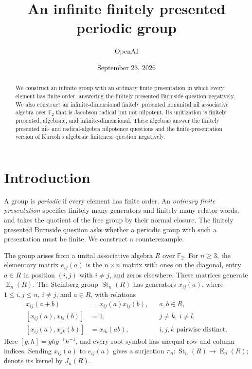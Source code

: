 \documentclass[11pt]{article}
\title{An infinite finitely presented periodic group}
\author{OpenAI}
\date{September 23, 2026}
\numberwithin{equation}{section}
\theoremstyle{definition}
\theoremstyle{remark}
\newcommand{\F}{\mathbb F}
\DeclareMathOperator{\St}{St}
\DeclareMathOperator{\E}{E}
\begin{document}
\maketitle
\begin{abstract}
We construct an infinite group with an ordinary finite presentation in
which every element has finite order, answering the finitely presented
Burnside question negatively. We also construct an infinite-dimensional
finitely presented nonunital nil associative algebra over $\F_2$ that is
Jacobson radical but not nilpotent. Its unitization is finitely presented,
algebraic, and infinite-dimensional. These algebras answer the finitely
presented nil- and radical-algebra nilpotence questions and the
finite-presentation version of Kurosh's algebraic finiteness question
negatively.
\end{abstract}

\section{Introduction}\label{sec:introduction}

A group is \emph{periodic} if every element has finite order. An
\emph{ordinary finite presentation} specifies finitely many generators
and finitely many relator words, and takes the quotient of the free
group by their normal closure. The finitely presented Burnside question
asks whether a periodic group with such a presentation must be finite.
We construct a counterexample.

The group arises from a unital associative algebra $R$ over $\F_2$.
For $n\geq3$, the elementary matrix $e_{ij}(a)$ is the $n\times n$
matrix with ones on the diagonal, entry $a\in R$ in position $(i,j)$
with $i\ne j$, and zeros elsewhere. These matrices generate $\E_n(R)$. The Steinberg
group $\St_n(R)$ has generators $x_{ij}(a)$, where
$1\leq i,j\leq n$, $i\ne j$, and $a\in R$, with relations
\begin{align}
 x_{ij}(a+b)&=x_{ij}(a)x_{ij}(b),
 &&a,b\in R,\label{fp:steinberg-addition}\\
 [x_{ij}(a),x_{kl}(b)]&=1,
 &&j\ne k,\ i\ne l,\label{fp:steinberg-commutation}\\
 [x_{ij}(a),x_{jk}(b)]&=x_{ik}(ab),
 &&i,j,k\text{ pairwise distinct}.\label{fp:steinberg-product}
\end{align}
Here $[g,h]=ghg^{-1}h^{-1}$, and every root symbol has unequal row and
column indices. Sending $x_{ij}(a)$ to $e_{ij}(a)$ gives a surjection
$\pi_n:\St_n(R)\to\E_n(R)$; denote its kernel by $J_n(R)$.
\end{document}
